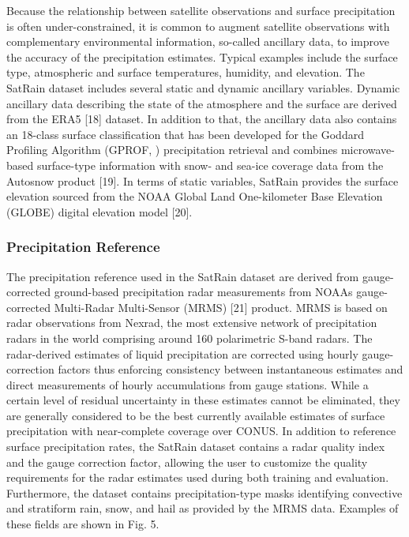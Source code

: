 \documentclass[11pt]{article}
\begin{document}
Because the relationship between satellite observations and surface precipitation is often under-constrained, it is common to augment satellite observations with complementary environmental information, so-called ancillary data, to improve the accuracy of the precipitation estimates. Typical examples include the surface type, atmospheric and surface temperatures, humidity, and elevation. The SatRain dataset includes several static and dynamic ancillary variables. Dynamic ancillary data describing the state of the atmosphere and the surface are derived from the ERA5 [18] dataset. In addition to that, the ancillary data also contains an 18-class surface classification that has been developed for the Goddard Profiling Algorithm (GPROF, ) precipitation retrieval and combines microwave-based surface-type information with snow- and sea-ice coverage data from the Autosnow product [19]. In terms of static variables, SatRain provides the surface elevation sourced from the NOAA Global Land One-kilometer Base Elevation (GLOBE) digital elevation model [20].

\subsubsection{Precipitation Reference}

The precipitation reference used in the SatRain dataset are derived from gauge-corrected ground-based precipitation radar measurements from NOAAs gauge-corrected Multi-Radar Multi-Sensor (MRMS) [21] product. MRMS is based on radar observations from Nexrad, the most extensive network of precipitation radars in the world comprising around 160 polarimetric S-band radars. The radar-derived estimates of liquid precipitation are corrected using hourly gauge-correction factors thus enforcing consistency between instantaneous estimates and direct measurements of hourly accumulations from gauge stations. While a certain level of residual uncertainty in these estimates cannot be eliminated, they are generally considered to be the best currently available estimates of surface precipitation with near-complete coverage over CONUS. In addition to reference surface precipitation rates, the SatRain dataset contains a radar quality index and the gauge correction factor, allowing the user to customize the quality requirements for the radar estimates used during both training and evaluation. Furthermore, the dataset contains precipitation-type masks identifying convective and stratiform rain, snow, and hail as provided by the MRMS data. Examples of these fields are shown in Fig. 5.
\end{document}
